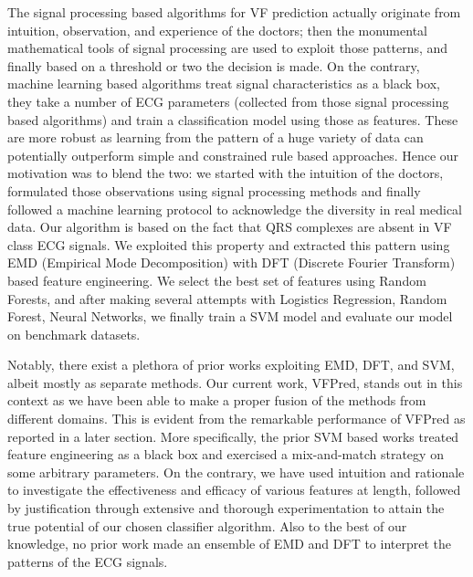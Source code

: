 \documentclass[12pt,a4paper]{article}
\begin{document}
The signal processing based algorithms for VF prediction actually originate from intuition, observation, and experience of the doctors; then the monumental mathematical tools of signal processing are used to exploit those patterns, and finally based on a threshold or two the decision is made. On the contrary, machine learning based algorithms treat signal characteristics as a black box, they take a number of ECG parameters (collected from those signal processing based algorithms) and train a classification model using those as features. These are more robust as learning from the pattern of a huge variety of data can potentially outperform simple and constrained rule based approaches. Hence our motivation was to blend the two: we started with the intuition of the doctors, formulated those observations using signal processing methods and finally followed a machine learning protocol to acknowledge the diversity in real medical data. Our algorithm is based on the fact that QRS complexes are absent in VF class ECG signals\cite{jones2009ecg}. We exploited this property and extracted this pattern using EMD (Empirical Mode Decomposition) with DFT (Discrete Fourier Transform) based feature engineering. We select the best set of features using Random Forests, and after making several attempts with Logistics Regression, Random Forest, Neural Networks, we finally train a SVM model and evaluate our model on benchmark datasets.%

Notably, there exist a plethora of prior works exploiting EMD, DFT, and SVM, albeit mostly as separate methods. Our current work, VFPred, stands out in this context as we have been able to make a proper fusion of the methods from different domains. This is evident from the remarkable performance of VFPred as reported in a later section. More specifically, the prior SVM based works treated feature engineering as a black box and exercised a mix-and-match strategy on some arbitrary parameters. On the contrary, we have used intuition and rationale to investigate the effectiveness and efficacy of various features at length, followed by justification through extensive and thorough experimentation to attain the true potential of our chosen classifier algorithm. Also to the best of our knowledge, no prior work made an ensemble of EMD and DFT to interpret the patterns of the ECG signals.
\end{document}
